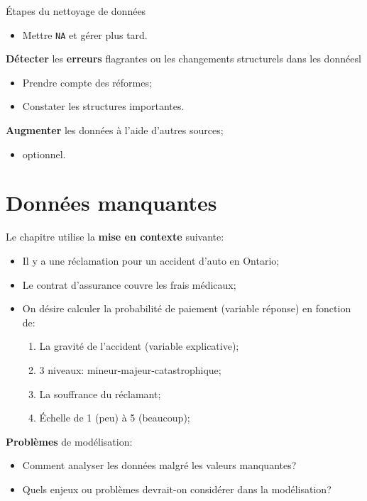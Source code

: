 \documentclass[10pt, french]{article}
\begin{document}
\begin{multicols*}{3}
\begin{algo}{Étapes du nettoyage de données}
\begin{todolist}[leftmargin = *]
\begin{itemize}
		\item	Mettre \texttt{NA} et gérer plus tard.
		\end{itemize}
	\item	\textbf{Détecter} les \textbf{erreurs} flagrantes ou les changements structurels dans les donnéesl
		\begin{itemize}
		\item	Prendre compte des réformes;
		\item	Constater les structures importantes.
		\end{itemize}
	\item	\textbf{Augmenter} les données à l'aide d'autres sources;
		\begin{itemize}
		\item	optionnel.
		\end{itemize}
\end{todolist}
\end{algo}

\section{Données manquantes}

Le chapitre utilise la \textbf{mise en contexte} suivante:
\begin{itemize}
	\item	Il y a une réclamation pour un accident d'auto en Ontario;
	\item	Le contrat d'assurance couvre les frais médicaux;
	\item	On désire calculer la probabilité de paiement (variable réponse) en fonction de:
		\begin{enumerate}
		\item	La gravité de l'accident (variable explicative);
		\item[]	3 niveaux: mineur-majeur-catastrophique;
		\item	La souffrance du réclamant;
		\item[]	Échelle de 1 (peu) à 5 (beaucoup);
		\end{enumerate}
\end{itemize}

\textbf{Problèmes} de modélisation:
\begin{itemize}
	\item	Comment analyser les données malgré les valeurs manquantes?
	\item	Quels enjeux ou problèmes devrait-on considérer dans la modélisation?
\end{itemize}


\end{multicols*}
\end{document}
